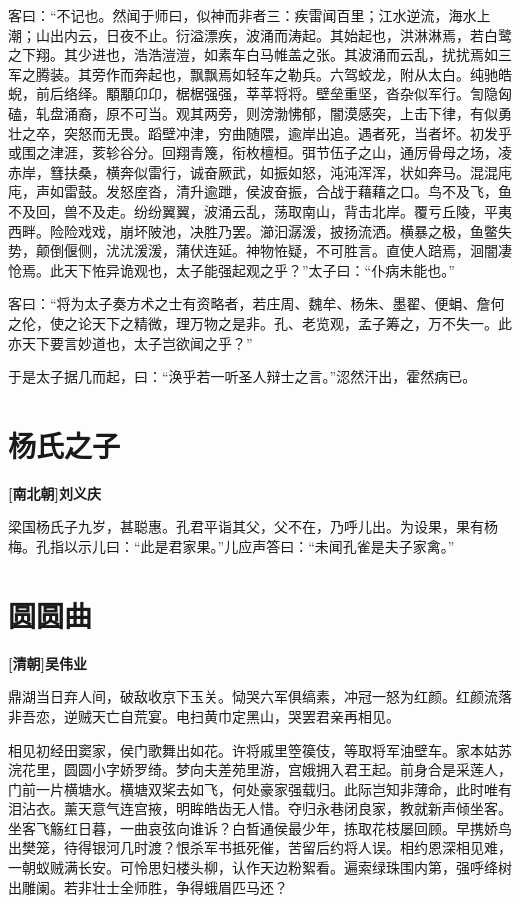\documentclass[UTF8,titlepage,oneside]{ctexbook}
\begin{document}
客曰：“不记也。然闻于师曰，似神而非者三：疾雷闻百里；江水逆流，海水上潮；山出内云，日夜不止。衍溢漂疾，波涌而涛起。其始起也，洪淋淋焉，若白鹭之下翔。其少进也，浩浩溰溰，如素车白马帷盖之张。其波涌而云乱，扰扰焉如三军之腾装。其旁作而奔起也，飘飘焉如轻车之勒兵。六驾蛟龙，附从太白。纯驰皓蜺，前后络绎。顒顒卬卬，椐椐强强，莘莘将将。壁垒重坚，沓杂似军行。訇隐匈磕，轧盘涌裔，原不可当。观其两旁，则滂渤怫郁，闇漠感突，上击下律，有似勇壮之卒，突怒而无畏。蹈壁冲津，穷曲随隈，逾岸出追。遇者死，当者坏。初发乎或围之津涯，荄轸谷分。回翔青篾，衔枚檀桓。弭节伍子之山，通厉骨母之场，凌赤岸，篲扶桑，横奔似雷行，诚奋厥武，如振如怒，沌沌浑浑，状如奔马。混混庉庉，声如雷鼓。发怒庢沓，清升逾跇，侯波奋振，合战于藉藉之口。鸟不及飞，鱼不及回，兽不及走。纷纷翼翼，波涌云乱，荡取南山，背击北岸。覆亏丘陵，平夷西畔。险险戏戏，崩坏陂池，决胜乃罢。瀄汩潺湲，披扬流洒。横暴之极，鱼鳖失势，颠倒偃侧，沋沋湲湲，蒲伏连延。神物恠疑，不可胜言。直使人踣焉，洄闇凄怆焉。此天下恠异诡观也，太子能强起观之乎？”太子曰：“仆病未能也。”


客曰：“将为太子奏方术之士有资略者，若庄周、魏牟、杨朱、墨翟、便蜎、詹何之伦，使之论天下之精微，理万物之是非。孔、老览观，孟子筹之，万不失一。此亦天下要言妙道也，太子岂欲闻之乎？”


于是太子据几而起，曰：“涣乎若一听圣人辩士之言。”涊然汗出，霍然病已。



\chapter*{杨氏之子}
\begin{center}
	\textbf{[南北朝]刘义庆}
\end{center}

梁国杨氏子九岁，甚聪惠。孔君平诣其父，父不在，乃呼儿出。为设果，果有杨梅。孔指以示儿曰：“此是君家果。”儿应声答曰：“未闻孔雀是夫子家禽。”


\chapter*{圆圆曲}
\begin{center}
	\textbf{[清朝]吴伟业}
\end{center}

鼎湖当日弃人间，破敌收京下玉关。恸哭六军俱缟素，冲冠一怒为红颜。红颜流落非吾恋，逆贼天亡自荒宴。电扫黄巾定黑山，哭罢君亲再相见。

相见初经田窦家，侯门歌舞出如花。许将戚里箜篌伎，等取将军油壁车。家本姑苏浣花里，圆圆小字娇罗绮。梦向夫差苑里游，宫娥拥入君王起。前身合是采莲人，门前一片横塘水。横塘双桨去如飞，何处豪家强载归。此际岂知非薄命，此时唯有泪沾衣。薰天意气连宫掖，明眸皓齿无人惜。夺归永巷闭良家，教就新声倾坐客。坐客飞觞红日暮，一曲哀弦向谁诉？白晳通侯最少年，拣取花枝屡回顾。早携娇鸟出樊笼，待得银河几时渡？恨杀军书抵死催，苦留后约将人误。相约恩深相见难，一朝蚁贼满长安。可怜思妇楼头柳，认作天边粉絮看。遍索绿珠围内第，强呼绛树出雕阑。若非壮士全师胜，争得蛾眉匹马还？
\end{document}
